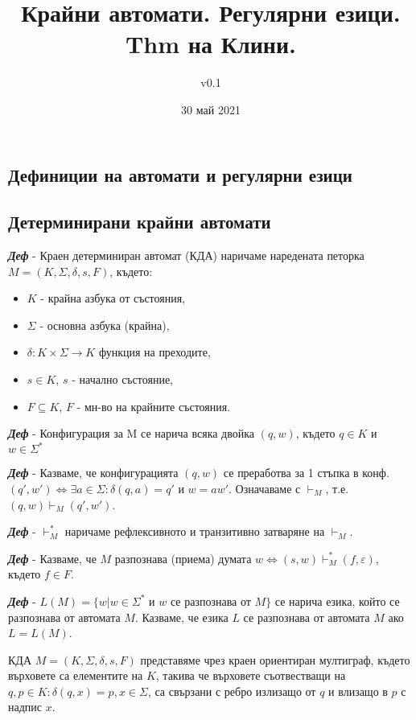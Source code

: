 \documentclass[fleqn,12pt]{article}
\title{Крайни автомати. Регулярни езици. Thm на Клини.}
\author{v0.1}
\date{30 май 2021}
\begin{document}
\maketitle

\tableofcontents
\pagebreak
\begin{flushleft}

\section{Дефиниции на автомати и регулярни езици}
\subsection{Детерминирани крайни автомати}

\textit{\textbf{Деф}} - Краен детерминиран автомат (КДА) наричаме наредената петорка $M = (K, \Sigma, \delta, s, F)$, където:
\begin{itemize}
    \item $K$ - крайна азбука от състояния,
    \item $\Sigma$ - основна азбука (крайна),
    \item $\delta : K \times \Sigma \rightarrow K$ функция на преходите,
    \item $s \in K$, $s$ - начално състояние,
    \item $F \subseteq K$, $F$ - мн-во на крайните състояния.
\end{itemize}

\textit{\textbf{Деф}} - Конфигурация за M се нарича всяка двойка $(q, w)$, където $q \in K$ и $w \in \Sigma^*$

\textit{\textbf{Деф}} - Казваме, че конфигурацията $(q, w)$ се преработва за 1 стъпка в конф. $(q', w') \iff \exists a \in \Sigma : \delta(q, a) = q'$ и $w = aw'$. Означаваме с $\vdash_M$, т.е. $(q, w) \vdash_M (q', w')$.

\textit{\textbf{Деф}} - $\vdash_M^*$ наричаме рефлексивното и транзитивно затваряне на $\vdash_M$.

\textit{\textbf{Деф}} - Казваме, че $M$ разпознава (приема) думата $w \iff (s, w) \vdash_M^* (f, \varepsilon)$, където $f \in F$.

\textit{\textbf{Деф}} - $L(M) = \{w | w \in \Sigma^*$ и $w$ се разпознава от $M\}$ се нарича езика, който се разпознава от автомата $M$. Казваме, че езика $L$ се разпознава от автомата $M$ ако $L = L(M)$.

КДА $M = (K, \Sigma, \delta, s, F)$ представяме чрез краен ориентиран мултиграф, където върховете са елементите на $K$, такива че върховете съотвестващи на $q, p \in K: \delta(q, x) = p, x \in \Sigma$, са свързани с ребро излизащо от $q$ и влизащо в $p$ с надпис $x$.


\end{flushleft}
\end{document}
